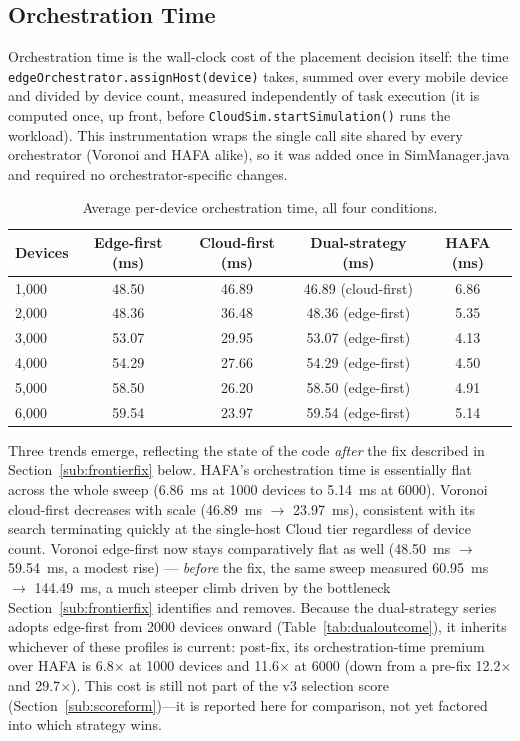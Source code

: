 \documentclass[10pt,conference]{IEEEtran}
\begin{document}
\subsection{Orchestration Time}\label{sub:orchtime}
Orchestration time is the wall-clock cost of the placement decision itself: the time \texttt{edgeOrchestrator.assignHost(device)} takes, summed over every mobile device and divided by device count, measured independently of task execution (it is computed once, up front, before \texttt{CloudSim.startSimulation()} runs the workload). This instrumentation wraps the single call site shared by every orchestrator (Voronoi and HAFA alike), so it was added once in SimManager.java and required no orchestrator-specific changes.

\begin{table}[!t]
\centering
\caption{Average per-device orchestration time, all four conditions.}
\label{tab:orchtime}
\begin{tabular}{lcccc}
\toprule
\textbf{Devices} & \textbf{Edge-first (ms)} & \textbf{Cloud-first (ms)} & \textbf{Dual-strategy (ms)} & \textbf{HAFA (ms)} \\
\midrule
1,000 & 48.50 & 46.89 & 46.89 (cloud-first) & 6.86 \\
2,000 & 48.36 & 36.48 & 48.36 (edge-first) & 5.35 \\
3,000 & 53.07 & 29.95 & 53.07 (edge-first) & 4.13 \\
4,000 & 54.29 & 27.66 & 54.29 (edge-first) & 4.50 \\
5,000 & 58.50 & 26.20 & 58.50 (edge-first) & 4.91 \\
6,000 & 59.54 & 23.97 & 59.54 (edge-first) & 5.14 \\
\bottomrule
\end{tabular}
\end{table}

Three trends emerge, reflecting the state of the code \emph{after} the fix described in Section~\ref{sub:frontierfix} below. HAFA's orchestration time is essentially flat across the whole sweep (6.86~ms at 1000 devices to 5.14~ms at 6000). Voronoi cloud-first decreases with scale (46.89~ms $\rightarrow$ 23.97~ms), consistent with its search terminating quickly at the single-host Cloud tier regardless of device count. Voronoi edge-first now stays comparatively flat as well (48.50~ms $\rightarrow$ 59.54~ms, a modest rise) --- \emph{before} the fix, the same sweep measured 60.95~ms $\rightarrow$ 144.49~ms, a much steeper climb driven by the bottleneck Section~\ref{sub:frontierfix} identifies and removes. Because the dual-strategy series adopts edge-first from 2000 devices onward (Table~\ref{tab:dualoutcome}), it inherits whichever of these profiles is current: post-fix, its orchestration-time premium over HAFA is 6.8$\times$ at 1000 devices and 11.6$\times$ at 6000 (down from a pre-fix 12.2$\times$ and 29.7$\times$). This cost is still not part of the v3 selection score (Section~\ref{sub:scoreform})---it is reported here for comparison, not yet factored into which strategy wins.
\end{document}
